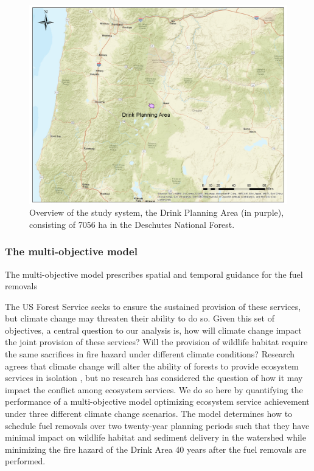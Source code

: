 \begin{figure}[ht]
\centering
\includegraphics[width=.85\textwidth]{../images/DrinkMap_Overview}
\caption[Overview of the study system, the Drink Planning Area]{Overview of the study system, the Drink Planning Area (in purple), consisting of 7056 ha in the Deschutes National Forest.}
\label{fig:drinkOverview}
\end{figure}

\subsubsection{The multi-objective model}
The multi-objective model prescribes spatial and temporal guidance for the fuel removals


The US Forest Service seeks to ensure the sustained provision of these services, but climate change may threaten their ability to do so. Given this set of objectives, a central question to our analysis is, how will climate change impact the joint provision of these services? Will the provision of wildlife habitat require the same sacrifices in fire hazard under different climate conditions? Research agrees that climate change will alter the ability of forests to provide ecosystem services in isolation \cite{iverson1998predicting}\cite{Goode20121}\cite{vose2012effects}, but no research has considered the question of how it may impact the conflict among ecosystem services. We do so here by quantifying the performance of a multi-objective model optimizing ecosystem service achievement under three different climate change scenarios. The model determines how to schedule fuel removals over two twenty-year planning periods such that they have minimal impact on wildlife habitat and sediment delivery in the watershed while minimizing the fire hazard of the Drink Area 40 years after the fuel removals are performed.

